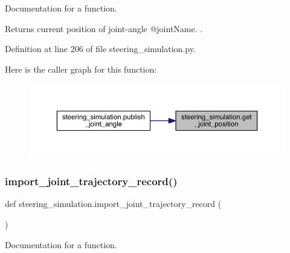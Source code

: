 Documentation for a function. 

Returns current position of joint-\/angle @joint\+Name. . 

Definition at line 206 of file steering\+\_\+simulation.\+py.


\begin{DoxyCode}{0}

\end{DoxyCode}
Here is the caller graph for this function\+:\nopagebreak
\begin{figure}[H]
\begin{center}
\leavevmode
\includegraphics[width=350pt]{namespacesteering__simulation_af5611a9446037e0aee0542ebe1c111fc_icgraph}
\end{center}
\end{figure}
\mbox{\label{namespacesteering__simulation_a628f6027d970db8d4071e5846de522fc}} 
\subsubsection{\texorpdfstring{import\_joint\_trajectory\_record()}{import\_joint\_trajectory\_record()}}
{\footnotesize\ttfamily def steering\+\_\+simulation.\+import\+\_\+joint\+\_\+trajectory\+\_\+record (\begin{DoxyParamCaption}{ }\end{DoxyParamCaption})}



Documentation for a function. 

